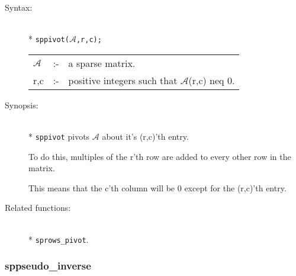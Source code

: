 \begin{description}
\item[Syntax:]\mbox{}\\*
\texttt{sppivot($\mathcal{A}$,r,c);}\\[2mm]
\begin{tabular}{l l l} 
$\mathcal{A}$ &:-& a sparse matrix. \\
r,c        &:-& positive integers such that $\mathcal{A}$(r,c) neq 0.
\end{tabular}

\item[Synopsis:]\mbox{}\\*
\texttt{sppivot} pivots $\mathcal{A}$ about it's (r,c)'th entry. 
 
To do this, multiples of the r'th row are added to every
     other row in the matrix. 

This means that the c'th column
                will be 0 except for the (r,c)'th entry. 

\item[Related functions:]\mbox{}\\*
\texttt{sprows\_pivot}.
\end{description}


\subsubsection{sppseudo\_inverse}
\label{sparse:sppseudo_inverse}

